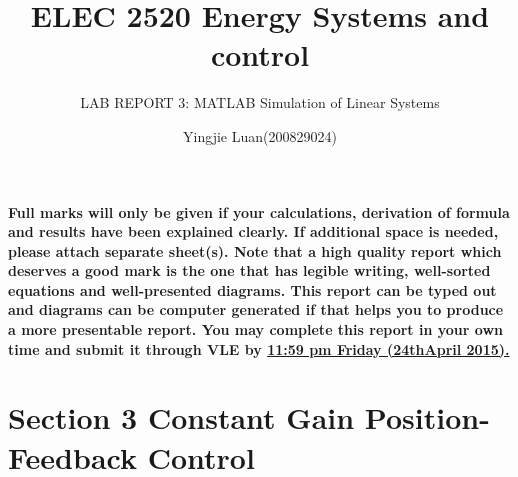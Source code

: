 \documentclass[11pt]{scrartcl}
\begin{document}
\title{ELEC 2520 Energy Systems and control}
\subtitle{ LAB REPORT 3: MATLAB Simulation of Linear Systems}
\author{Yingjie Luan(200829024)}
\maketitle

%

\textbf{Full marks will only be given if your calculations, derivation of formula and results have been explained clearly. If additional space is needed, please attach separate sheet(s). Note that a high quality report which deserves a good mark is the one that has legible writing, well-sorted equations and well-presented diagrams. This report can be typed out and diagrams can be computer generated if that helps you to produce a more presentable report. You may complete this report in your own time and submit it through VLE by \underline{11:59 pm Friday (24thApril 2015).} }

\section*{Section 3 Constant Gain Position-Feedback Control}
\end{document}
